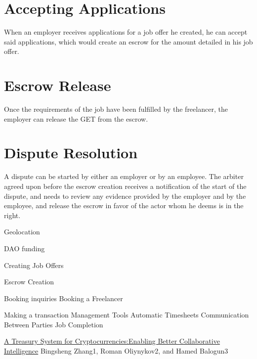 \documentclass{article}
\begin{document}
\section{Accepting Applications}
When an employer receives applications for a job offer he created, he can accept said applications, which would create an escrow for the amount detailed in his job offer.

\section{Escrow Release}
Once the requirements of the job have been fulfilled by the freelancer, the employer can release the GET from the escrow.

\section{Dispute Resolution}
A dispute can be started by either an employer or by an employee. The arbiter agreed upon before the escrow creation receives a notification of the start of the dispute, and needs to review any evidence provided by the employer and by the employee, and release the escrow in favor of the actor whom he deems is in the right.

Geolocation

DAO funding


Creating Job Offers



Escrow Creation

Booking inquiries
Booking a Freelancer

Making a transaction
Management Tools
Automatic Timesheets
Communication Between Parties
Job Completion


\begin{thebibliography}{99}

\href{https://www.lancaster.ac.uk/staff/zhangb2/treasury.pdf}{A Treasury System for Cryptocurrencies:Enabling Better Collaborative Intelligence}
Bingsheng Zhang1, Roman Oliynykov2, and Hamed Balogun3

\end{thebibliography}
\end{document}
